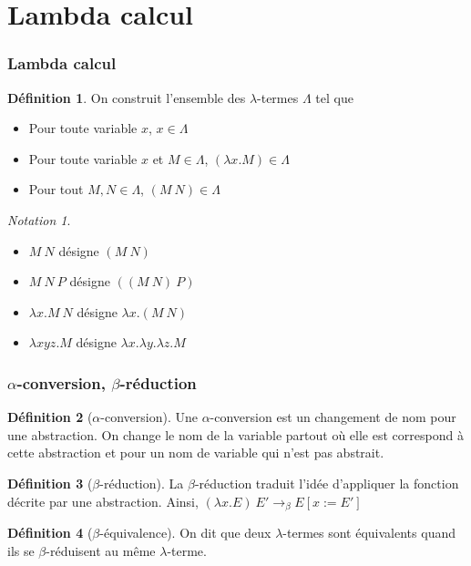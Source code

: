 \documentclass[11pt,a4paper]{beamer}
\theoremstyle{plain}
\theoremstyle{definition}
\newtheorem{defn}{Définition}[section]
\theoremstyle{remark}
\newtheorem*{notation}{Notation}
\begin{document}
\section{Lambda calcul}
\begin{frame}
\frametitle{Lambda calcul}
\begin{defn}
On construit l'ensemble des $\lambda$-termes $\Lambda$ tel que
\begin{itemize}
\item Pour toute variable $x$, $x\in\Lambda$
\item Pour toute variable $x$ et $M\in\Lambda$, $(\lambda x.M)\in\Lambda$
\item Pour tout $M,N\in\Lambda$, $(M~N)\in\Lambda$
\end{itemize}
\end{defn}

\begin{notation}
\begin{itemize}
\item $M~N$ désigne $(M~N)$
\item $M~N~P$ désigne $((M~N)~P)$
\item $\lambda x.M~N$ désigne $\lambda x.(M~N)$
\item $\lambda xyz.M$ désigne $\lambda x.\lambda y. \lambda z. M$
\end{itemize}
\end{notation}
\end{frame}

\begin{frame}
\frametitle{$\alpha$-conversion, $\beta$-réduction}
\begin{defn}[$\alpha$-conversion]
Une $\alpha$-conversion est un changement de nom pour une abstraction. On change le nom de la variable partout où elle est correspond à cette abstraction et pour un nom de variable qui n'est pas abstrait.
\end{defn}

\begin{defn}[$\beta$-réduction]
La $\beta$-réduction traduit l'idée d'appliquer la fonction décrite par une abstraction. Ainsi, $(\lambda x.E)~E'\rightarrow_\beta E[x:=E']$ 
\end{defn}

\begin{defn}[$\beta$-équivalence]
On dit que deux $\lambda$-termes sont équivalents quand ils se $\beta$-réduisent au même $\lambda$-terme.
\end{defn}
\end{frame}
\end{document}
